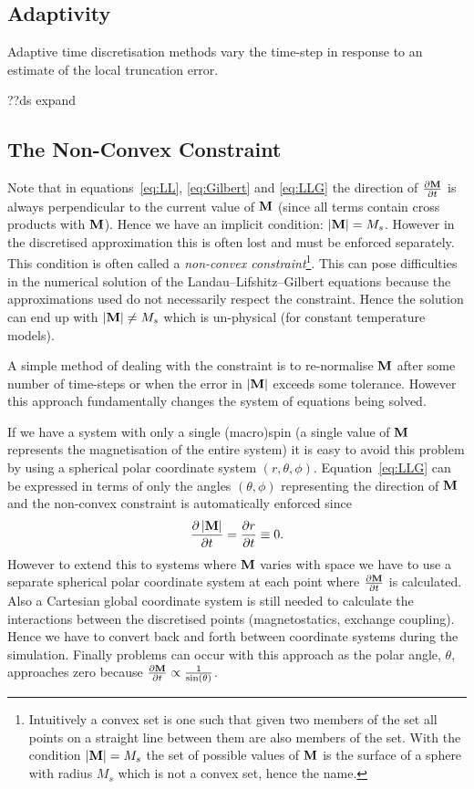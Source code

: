 \subsection{Adaptivity}
\label{sec:adaptivity}

Adaptive time discretisation methods vary the time-step in response to an estimate of the local truncation error.

??ds expand

\subsection{The Non-Convex Constraint}
\label{sec:ensuring-constant-mv}

Note that in equations~\eqref{eq:LL}, \eqref{eq:Gilbert} and \eqref{eq:LLG} the direction of $\frac{\partial \mathbf{M}}{\partial t}$ is always perpendicular to the current value of $\mathbf{M}$ (since all terms contain cross products with $\mathbf{M}$). Hence we have an implicit condition: $\left|{\mathbf{M}} \right| = M_s$. However in the discretised approximation this is often lost and must be enforced separately. This condition is often called a  \emph{non-convex constraint}\footnote{Intuitively a convex set is one such that given two members of the set all points on a straight line between them are also members of the set. With the condition $\left|{\mathbf{M}} \right|=M_s$ the set of possible values of $\mathbf{M}$ is the surface of a sphere with radius $M_s$ which is not a convex set, hence the name.}. This can pose difficulties in the numerical solution of the Landau--Lifshitz--Gilbert equations because the approximations used do not necessarily respect the constraint. Hence the solution can end up with $|\mathbf{M}| \neq M_s$ which is un-physical (for constant temperature models).

A simple method of dealing with the constraint is to re-normalise $\mathbf{M}$ after some number of time-steps or when the error in $|\mathbf{M}|$ exceeds some tolerance.\cite{Fidler2000} However this approach fundamentally changes the system of equations being solved.\cite{Lewis2003}

If we have a system with only a single (macro)spin (\ie a single value of $\mathbf{M}$ represents the magnetisation of the entire system) it is easy to avoid this problem by using a spherical polar coordinate system $(r,\theta,\phi)$. Equation~\eqref{eq:LLG} can be expressed in terms of only the angles $(\theta,\phi)$ representing the direction of $\mathbf{M}$ and the non-convex constraint is automatically enforced since
\begin{equation}
  \label{eq:40}
  \frac{\partial \left|{\mathbf{M}} \right|}{\partial t} = \frac{\partial r}{\partial t} \equiv 0.
\end{equation}
However to extend this to systems where $\mathbf{M}$ varies with space we have to use a separate spherical polar coordinate system at each point where $\frac{\partial \mathbf{M}}{\partial t}$ is calculated. Also a Cartesian global coordinate system is still needed to calculate the interactions between the discretised points (\ie magnetostatics, exchange coupling). Hence we have to convert back and forth between coordinate systems during the simulation.\cite{Scholz2003} Finally problems can occur with this approach as the polar angle, $\theta$, approaches zero because $\frac{\partial \mathbf{M}}{\partial t} \propto \frac{1}{\sin(\theta)}$.\cite{Fukushima2005}

